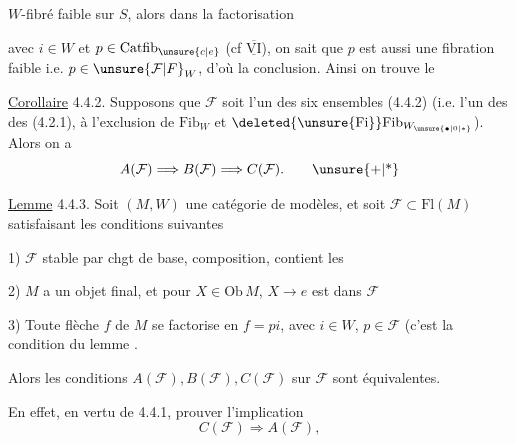 
$W$-fibré faible sur $S$, alors dans la factorisation


avec $i\in W$ et $p\in\mathrm{Catfib}_{\unsure{c|e}}$ (cf $\overline{\underline{\mathrm{VI}}}$), on sait que $p$ est aussi une fibration faible i.e. $p\in\unsure{\mathcal{F}|F}_{W}$, d'où la conclusion. Ainsi on trouve le

\uline{Corollaire} 4.4.2. Supposons que $\mathcal{F}$ soit l'un des six ensembles (4.4.2) (i.e. l'un des  des   (4.2.1), à l'exclusion de $\mathrm{Fib}_{W}$ et $\deleted{\unsure{\mathrm{Fi}}}\mathrm{Fib}_{W_{\unsure{\bullet|0|*}}}$). Alors on a
\[
 A(\mathcal{F})\Longrightarrow B(\mathcal{F})\Longrightarrow C(\mathcal{F}). \tag*{\unsure{+|*}}
\]

\uline{Lemme} 4.4.3. Soit $(M,W)$ une catégorie de modèles, et soit $\mathcal{F}\subset\mathrm{Fl}(M)$ satisfaisant les conditions suivantes

1) $\mathcal{F}$ stable par chgt de base, composition, contient les 

2) $M$ a un objet final, et pour  $X\in\mathrm{Ob}\,M$, $X\longrightarrow e$ est dans $\mathcal{F}$

3) Toute flèche $f$ de $M$ se factorise en $f=pi$, avec $i\in W$, $p\in\mathcal{F}$ (c'est la condition du lemme .

Alors les conditions $A(\mathcal{F}),B(\mathcal{F}),C(\mathcal{F})$ sur $\mathcal{F}$ sont équivalentes.

En effet, en vertu de 4.4.1,     prouver l'implication
\[
 C(\mathcal{F})\Longrightarrow A(\mathcal{F}),
\]
